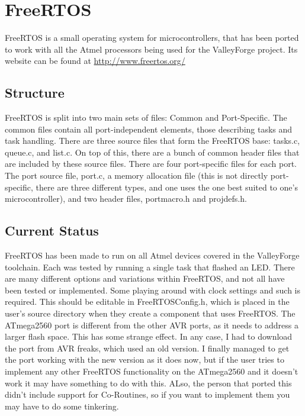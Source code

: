 \documentclass[a4paper, oneside, 11pt, titlepage, onecolumn, openright]{report}
\begin{document}
\chapter{FreeRTOS}
			\label{C:FreeRTOS}
			FreeRTOS is a small operating system for microcontrollers, that has been ported to work with all the Atmel processors being used for the ValleyForge project. Its website can be found at \url{http://www.freertos.org/}
			
\section{Structure}
			\label{s:FreeRTOSStructure}
			FreeRTOS is split into two main sets of files: Common and Port-Specific. The common files contain all port-independent elements, those describing tasks and task handling.\newline
			There are three source files that form the FreeRTOS base: tasks.c, queue.c, and list.c. On top of this, there are a bunch of common header files that are included by these source files.\newline
			There are four port-specific files for each port. The port source file, port.c, a memory allocation file (this is not directly port-specific, there are three different types, and one uses the one best suited to one's microcontroller), and two header files, portmacro.h and projdefs.h. 			
						
			
\section{Current Status}
			\label{s:FreeRTOSCurrentStatus}
			FreeRTOS has been made to run on all Atmel devices covered in the ValleyForge toolchain. Each was tested by running a single task that flashed an LED. There are many different options and variations within FreeRTOS, and not all have been tested or implemented. \newline
			Some playing around with clock settings and such is required. This should be editable in FreeRTOSConfig.h, which is placed in the user's source directory when they create a component that uses FreeRTOS.\newline
			The ATmega2560 port is different from the other AVR ports, as it needs to address a larger flash space. This has some strange effect. In any case, I had to download the port from AVR freaks, which used an old version. I finally managed to get the port working with the new version as it does now, but if the user tries to implement any other FreeRTOS functionality on the ATmega2560 and it doesn't work it may have something to do with this. ALso, the person that ported this didn't include support for Co-Routines, so if you want to implement them you may have to do some tinkering.
			
\end{document}
